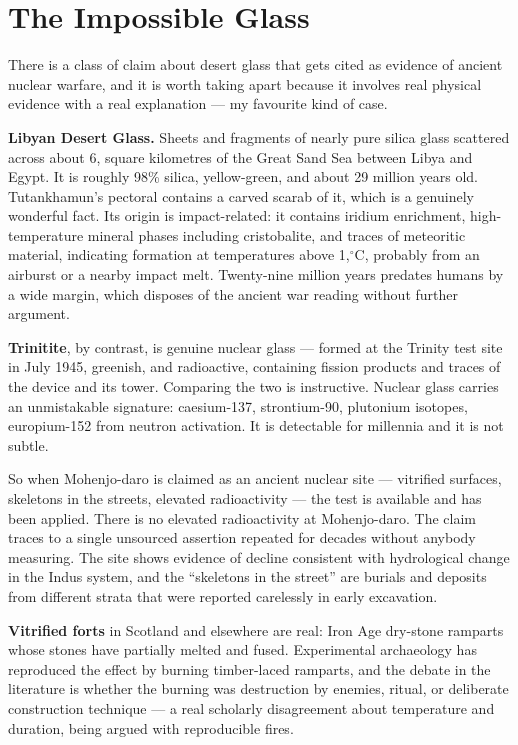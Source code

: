 \section{The Impossible Glass}\label{sec:impossibleglass}

There is a class of claim about desert glass that gets cited as evidence of ancient nuclear
warfare, and it is worth taking apart because it involves real physical evidence with a real
explanation --- my favourite kind of case.

\textbf{Libyan Desert Glass.} Sheets and fragments of nearly pure silica glass scattered across
about 6, square kilometres of the Great Sand Sea between Libya and Egypt. It is roughly 98\%
silica, yellow-green, and about 29 million years old. Tutankhamun's pectoral contains a carved
scarab of it, which is a genuinely wonderful fact. Its origin is impact-related: it contains
iridium enrichment, high-temperature mineral phases including cristobalite, and traces of
meteoritic material, indicating formation at temperatures above 1,$^\circ$C, probably from
an airburst or a nearby impact melt. Twenty-nine million years predates humans by a wide
margin, which disposes of the ancient war reading without further argument.

\textbf{Trinitite}, by contrast, is genuine nuclear glass --- formed at the Trinity test site in
July 1945, greenish, and radioactive, containing fission products and traces of the device and
its tower. Comparing the two is instructive. Nuclear glass carries an unmistakable signature:
caesium-137, strontium-90, plutonium isotopes, europium-152 from neutron activation. It is
detectable for millennia and it is not subtle.

So when Mohenjo-daro is claimed as an ancient nuclear site --- vitrified surfaces, skeletons in
the streets, elevated radioactivity --- the test is available and has been applied. There is no
elevated radioactivity at Mohenjo-daro. The claim traces to a single unsourced assertion
repeated for decades without anybody measuring. The site shows evidence of decline consistent
with hydrological change in the Indus system, and the ``skeletons in the street'' are burials
and deposits from different strata that were reported carelessly in early excavation.

\textbf{Vitrified forts} in Scotland and elsewhere are real: Iron Age dry-stone ramparts whose
stones have partially melted and fused. Experimental archaeology has reproduced the effect by
burning timber-laced ramparts, and the debate in the literature is whether the burning was
destruction by enemies, ritual, or deliberate construction technique --- a real scholarly
disagreement about temperature and duration, being argued with reproducible fires.

